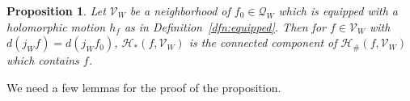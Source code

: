 \documentclass{amsart}
\numberwithin{equation}{section}
\newtheorem{proposition}[theorem]{Proposition}%
\theoremstyle{definition}
\theoremstyle{remark}
\begin{document}
\begin{proposition}\label{prop:connected set} 
Let $\mathcal{V}_W$ be a neighborhood of $f_0\in \mathcal{Q}_W$ which is equipped with a holomorphic motion $h_f$ as in Definition~\ref{dfn:equipped}. Then for $f\in \mathcal{V}_W$ with $d(j_W f)=d(j_W f_0)$, 
$\mathcal{H}_*(f,\mathcal{V}_W)$ is the connected component of $\mathcal{H}_\#(f, \mathcal{V}_W)$ which contains $f$. 
\end{proposition}

We need a few lemmas for the proof of the proposition. 
\end{document}
